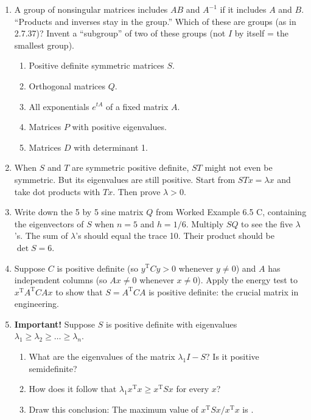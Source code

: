 \documentclass[14pt, a4paper]{article}
\begin{document}
\begin{enumerate}[resume]
    \item A group of nonsingular matrices includes $AB$ and $A^{-1}$ if it includes $A$ and $B$. ``Products and inverses stay in the group.'' Which of these are groups (as in 2.7.37)? Invent a ``subgroup'' of two of these groups (not $I$ by itself = the smallest group).
          \begin{enumerate}
              \item Positive definite symmetric matrices $S$.
              \item Orthogonal matrices $Q$.
              \item All exponentials $e^{tA}$ of a fixed matrix $A$.
              \item Matrices $P$ with positive eigenvalues.
              \item Matrices $D$ with determinant 1.
          \end{enumerate}

    \item When $S$ and $T$ are symmetric positive definite, $ST$ might not even be symmetric. But its eigenvalues are still positive. Start from $STx = \lambda x$ and take dot products with $Tx$. Then prove $\lambda > 0$.

    \item Write down the 5 by 5 sine matrix $Q$ from Worked Example 6.5 C, containing the eigenvectors of $S$ when $n = 5$ and $h = 1/6$. Multiply $SQ$ to see the five $\lambda$'s. The sum of $\lambda$'s should equal the trace 10. Their product should be $\det S = 6$.

    \item Suppose $C$ is positive definite (so $y^{\mathrm{T}}Cy > 0$ whenever $y \ne 0$) and $A$ has independent columns (so $Ax \ne 0$ whenever $x \ne 0$). Apply the energy test to $x^{\mathrm{T}}A^{\mathrm{T}}CAx$ to show that $S = A^{\mathrm{T}}CA$ is positive definite: the crucial matrix in engineering.

    \item \textbf{Important!} Suppose $S$ is positive definite with eigenvalues $\lambda_1 \ge \lambda_2 \ge \dots \ge \lambda_n$.
          \begin{enumerate}
              \item What are the eigenvalues of the matrix $\lambda_1I - S$? Is it positive semidefinite?
              \item How does it follow that $\lambda_1x^{\mathrm{T}}x \ge x^{\mathrm{T}}Sx$ for every $x$?
              \item Draw this conclusion: The maximum value of $x^{\mathrm{T}}Sx/x^{\mathrm{T}}x$ is \underline{\hspace{1cm}}.
          \end{enumerate}


\end{enumerate}
\end{document}
